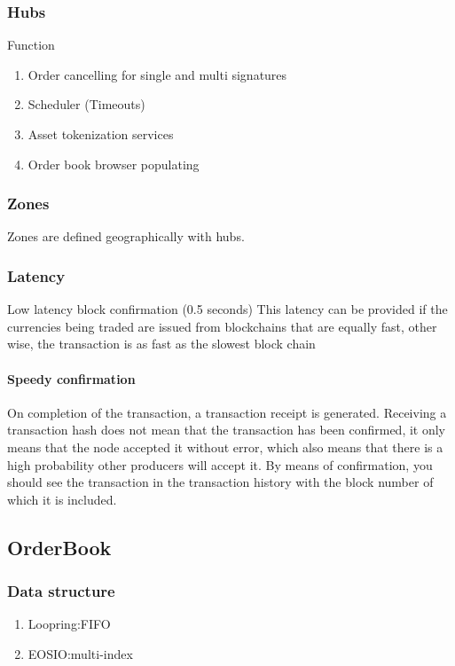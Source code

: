 \documentclass[]{article}
\begin{document}
	\subsubsection{Hubs}
	Function 
	\begin{enumerate}
		\item Order cancelling for single and multi signatures 
		\item Scheduler (Timeouts)
		\item Asset tokenization services
		\item Order book browser populating
	\end{enumerate}
	\subsubsection{Zones}
	Zones are defined geographically with hubs.
	
	
	
	\subsubsection{Latency}	
	Low latency block confirmation (0.5 seconds)
	This latency can be provided if the currencies being traded are issued from blockchains that are equally fast, other wise, the transaction is as fast as the slowest block chain
	\paragraph{Speedy confirmation}
	On completion of the transaction, a transaction receipt is generated. Receiving a transaction hash does not mean that the transaction has been confirmed, it only means that the node accepted it without error, which also means that there is a high probability other producers will accept it. By means of confirmation, you should see the transaction in the transaction history with the block number of which it is included.

\subsection{OrderBook}

\subsubsection{Data structure}
\begin{enumerate}
\item Loopring:FIFO
\item EOSIO:multi-index
\end{enumerate}
\end{document}
